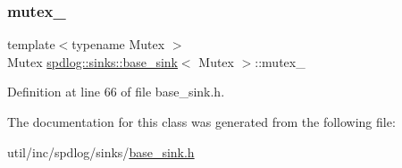 \subsubsection{\texorpdfstring{mutex\+\_\+}{mutex\_}}
{\footnotesize\ttfamily template$<$typename Mutex $>$ \\
Mutex \hyperlink{classspdlog_1_1sinks_1_1base__sink}{spdlog\+::sinks\+::base\+\_\+sink}$<$ Mutex $>$\+::mutex\+\_\+\hspace{0.3cm}{\ttfamily [protected]}}



Definition at line 66 of file base\+\_\+sink.\+h.



The documentation for this class was generated from the following file\+:\begin{DoxyCompactItemize}
\item 
util/inc/spdlog/sinks/\hyperlink{base__sink_8h}{base\+\_\+sink.\+h}\end{DoxyCompactItemize}

